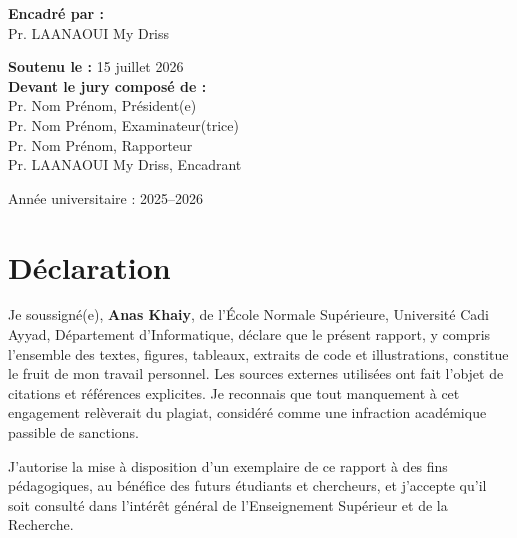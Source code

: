 \documentclass[a4paper,11pt,oneside]{book}
\begin{document}
\begin{titlepage}
\begin{center}
\begin{tcolorbox}[
  enhanced,
  width=0.96\textwidth,
  height=0.97\textheight,
  colback=coverbg,
  colframe=coverline,
  boxrule=0.8pt,
  arc=2mm,
  left=14pt,
  right=14pt,
  top=12pt,
  bottom=16pt
]
\vspace{0.4cm}
\begin{flushleft}
\hspace{0.5cm}\textbf{Encadré par :}\\[0.2cm]
\hspace{1.2cm}Pr. LAANAOUI My Driss
\end{flushleft}
\vspace{0.3cm}
\begin{flushleft}
\hspace{0.5cm}\textbf{Soutenu le :} 15 juillet 2026\\[0.25cm]
\hspace{0.5cm}\textbf{Devant le jury composé de :}\\[0.2cm]
\hspace{1.2cm}Pr. Nom Prénom, Président(e)\\
\hspace{1.2cm}Pr. Nom Prénom, Examinateur(trice)\\
\hspace{1.2cm}Pr. Nom Prénom, Rapporteur\\
\hspace{1.2cm}Pr. LAANAOUI My Driss, Encadrant
\end{flushleft}
\vfill
\vspace{0.75cm}
{\large Année universitaire : 2025--2026}
\end{tcolorbox}
\end{center}
\end{titlepage}

\restoregeometry
\fontsize{12pt}{15pt}\selectfont

    \newpage
    \thispagestyle{empty}
    \chapter*{Déclaration}
Je soussigné(e), \textbf{Anas Khaiy}, de l’École Normale Supérieure, Université Cadi Ayyad, Département d’Informatique, déclare que le présent rapport, y compris l’ensemble des textes, figures, tableaux, extraits de code et illustrations, constitue le fruit de mon travail personnel. Les sources externes utilisées ont fait l’objet de citations et références explicites. Je reconnais que tout manquement à cet engagement relèverait du plagiat, considéré comme une infraction académique passible de sanctions.

\medskip
\noindent
J’autorise la mise à disposition d’un exemplaire de ce rapport à des fins pédagogiques, au bénéfice des futurs étudiants et chercheurs, et j’accepte qu’il soit consulté dans l’intérêt général de l’Enseignement Supérieur et de la Recherche.
\end{document}
